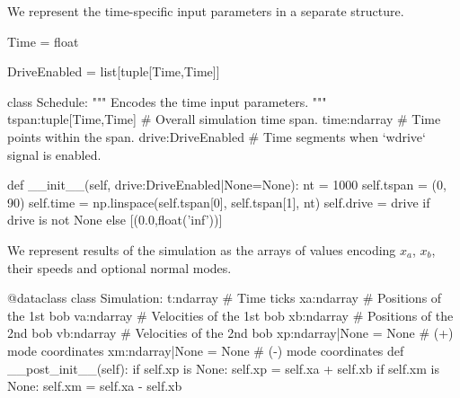 We represent the time-specific input parameters in a separate structure.

  \begin{python}
  Time = float
  
  DriveEnabled = list[tuple[Time,Time]]
  
  class Schedule:
    """ Encodes the time input parameters. """
    tspan:tuple[Time,Time]   # Overall simulation time span.
    time:ndarray             # Time points within the span.
    drive:DriveEnabled       # Time segments when `wdrive` signal is enabled.
  
    def __init__(self, drive:DriveEnabled|None=None):
      nt = 1000
      self.tspan = (0, 90)
      self.time = np.linspace(self.tspan[0], self.tspan[1], nt)
      self.drive = drive if drive is not None else [(0.0,float('inf'))]
  \end{python}


We represent results of the simulation as the arrays of values encoding $x_a$, $x_b$, their
speeds and optional normal modes.


  \begin{comment}
    \begin{sh}
    printf '\\begin{%
    cat $PROJECT_ROOT/python/mechanical_bloch.py | sedlines.sh Simulation
    printf '\\end{%
    \end{sh}
  \end{comment}

  \begin{python}
  @dataclass
  class Simulation:
    t:ndarray                # Time ticks
    xa:ndarray               # Positions of the 1st bob
    va:ndarray               # Velocities of the 1st bob
    xb:ndarray               # Positions of the 2nd bob
    vb:ndarray               # Velocities of the 2nd bob
    xp:ndarray|None = None   # (+) mode coordinates
    xm:ndarray|None = None   # (-) mode coordinates
    def __post_init__(self):
      if self.xp is None:
        self.xp = self.xa + self.xb
      if self.xm is None:
        self.xm = self.xa - self.xb
  \end{python}

